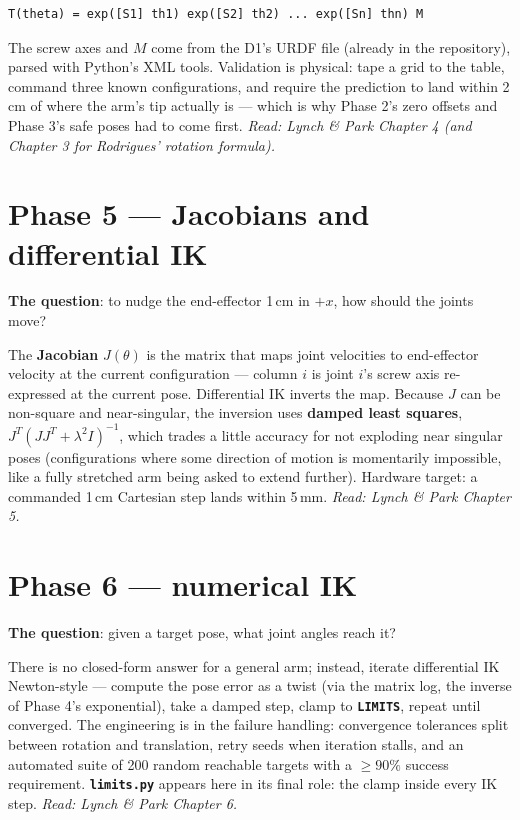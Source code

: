 \documentclass[11pt,twoside,openright]{book}
\newcommand{\code}[1]{\texttt{\bfseries #1}}
\begin{document}
\begin{lstlisting}
T(theta) = exp([S1] th1) exp([S2] th2) ... exp([Sn] thn) M
\end{lstlisting}

The screw axes and $M$ come from the D1's URDF file (already in the
repository), parsed with Python's XML tools. Validation is physical: tape
a grid to the table, command three known configurations, and require the
prediction to land within 2\,cm of where the arm's tip actually is ---
which is why Phase 2's zero offsets and Phase 3's safe poses had to come
first. \emph{Read: Lynch \& Park Chapter 4 (and Chapter 3 for Rodrigues'
rotation formula).}

\section{Phase 5 --- Jacobians and differential IK}

\textbf{The question}: to nudge the end-effector 1\,cm in $+x$, how
should the joints move?

The \textbf{Jacobian} $J(\theta)$ is the matrix that maps joint
velocities to end-effector velocity at the current configuration ---
column $i$ is joint $i$'s screw axis re-expressed at the current pose.
Differential IK inverts the map. Because $J$ can be non-square and
near-singular, the inversion uses \textbf{damped least squares},
$J^{T}(JJ^{T}+\lambda^{2}I)^{-1}$, which trades a little accuracy for not
exploding near singular poses (configurations where some direction of
motion is momentarily impossible, like a fully stretched arm being asked
to extend further). Hardware target: a commanded 1\,cm Cartesian step
lands within 5\,mm. \emph{Read: Lynch \& Park Chapter 5.}

\section{Phase 6 --- numerical IK}

\textbf{The question}: given a target pose, what joint angles reach it?

There is no closed-form answer for a general arm; instead, iterate
differential IK Newton-style --- compute the pose error as a twist
(via the matrix log, the inverse of Phase 4's exponential), take a
damped step, clamp to \code{LIMITS}, repeat until converged. The
engineering is in the failure handling: convergence tolerances split
between rotation and translation, retry seeds when iteration stalls, and
an automated suite of 200 random reachable targets with a $\ge 90\%$
success requirement. \code{limits.py} appears here in its final role:
the clamp inside every IK step. \emph{Read: Lynch \& Park Chapter 6.}
\end{document}

